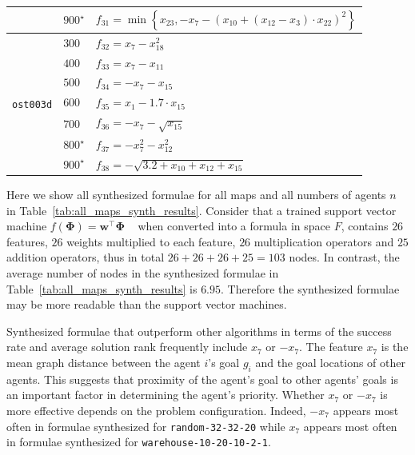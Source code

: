 \documentclass[letterpaper]{article}
\begin{document}
\begin{table}[t!]
{\begin{adjustbox}{width=0.1\columnwidth}
\begin{tabular}{c|l|l}
            & $ 900^\star $ & $ f_{31} = \min\left\{x_{23}, -x_{7} - \left(x_{10} + \left(x_{12} - x_{3}\right) \cdot x_{22}\right)^2\right\} $ \\
            \hline
            \multirow{7}{*}{\begin{turn}{90} {\tt ost003d} \end{turn}}
            & $ 300 $ & $ f_{32} = x_{7} - x_{18}^2 $ \\
            & $ 400 $ & $ f_{33} = x_{7} - x_{11} $ \\
            & $ 500 $ & $ f_{34} = -x_{7} - x_{15} $ \\
            & $ 600 $ & $ f_{35} = x_{1} - 1.7 \cdot x_{15} $ \\
            & $ 700 $ & $ f_{36} = -x_{7} -\sqrt{x_{15}} $ \\
            & $ 800^\star $ & $ f_{37} = - x_{7}^2 - x_{12}^2 $ \\
            & $ 900^\star $ & $ f_{38} = -\sqrt{3.2 + x_{10} + x_{12} + x_{15}} $ \\ \bottomrule
        \end{tabular}
\end{adjustbox}}
\end{table}

Here we show all synthesized formulae for all maps and all numbers of agents $ n $ in Table~\ref{tab:all_maps_synth_results}. Consider that a trained support vector machine $ f(\mathbf{\Phi}) = \mathbf{w}^\intercal \mathbf{\Phi} $ ~\citep{zhang2022learning} when converted into a formula in space $ F $, contains $ 26 $ features, $ 26 $ weights multiplied to each feature, $ 26 $ multiplication operators and $ 25 $ addition operators, thus in total $ 26 + 26 + 26 + 25 = 103 $ nodes. In contrast, the average number of nodes in the synthesized formulae in Table~\ref{tab:all_maps_synth_results} is $ 6.95 $. Therefore the synthesized formulae may be more readable than the support vector machines.

Synthesized formulae that outperform other algorithms in terms of the success rate and average solution rank frequently include $ x_7 $ or $ -x_{7} $. The feature $ x_7 $ is the mean graph distance between the agent $ i $'s goal $ g_i $ and the goal locations of other agents. This suggests that proximity of the agent's goal to other agents' goals is an important factor in determining the agent's priority. Whether $ x_7 $ or $ -x_7 $ is more effective depends on the problem configuration. Indeed, $ -x_7 $ appears most often in formulae synthesized for {\tt random-32-32-20} while $ x_7 $ appears most often in formulae synthesized for {\tt warehouse-10-20-10-2-1}.
\end{document}
